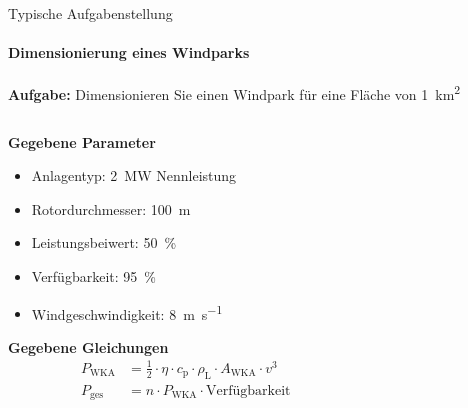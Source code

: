 \documentclass[aspectratio=169,11pt]{beamer}
\begin{document}
\begin{frame}{Typische Aufgabenstellung}
    \framesubtitle{Dimensionierung eines Windparks}
    \textbf{Aufgabe:} Dimensionieren Sie einen Windpark für eine Fläche von \qty{1}{\kilo\meter\squared}
    \begin{columns}[T]
    \hspace*{-0.15cm}
        \begin{column}{0.45\textwidth}          
            \vspace{0.25em}
            \textbf{Gegebene Parameter}
            \begin{itemize}
                \item Anlagentyp: \qty{2}{\mega\watt} Nennleistung
                \item Rotordurchmesser: \qty{100}{\meter}
                \item Leistungsbeiwert: \qty{50}{\percent}
                \item Verfügbarkeit: \qty{95}{\percent}
                \item Windgeschwindigkeit: \qty{8}{\meter\per\second}
            \end{itemize}
            
            \vspace{0.25em}
            \textbf{Gegebene Gleichungen}
            \begin{align*}
            	P_{\text{WKA}} &= \frac{1}{2} \cdot \eta \cdot c_\text{p} \cdot \rho_\text{L} \cdot A_{\text{WKA}} \cdot v^3  \\
            	P_\text{ges} &= n \cdot P_\text{WKA}  \cdot \text{Verfügbarkeit}
            \end{align*}
        \end{column}
        
        \begin{column}{0.55\textwidth}
        \vspace*{0.75cm}
\end{column}
\end{columns}
\end{frame}
\end{document}
